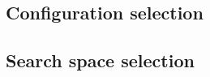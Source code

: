 \documentclass{article}
\begin{document}
\subsection{Configuration selection}
\subsection{Search space selection}
\end{document}
